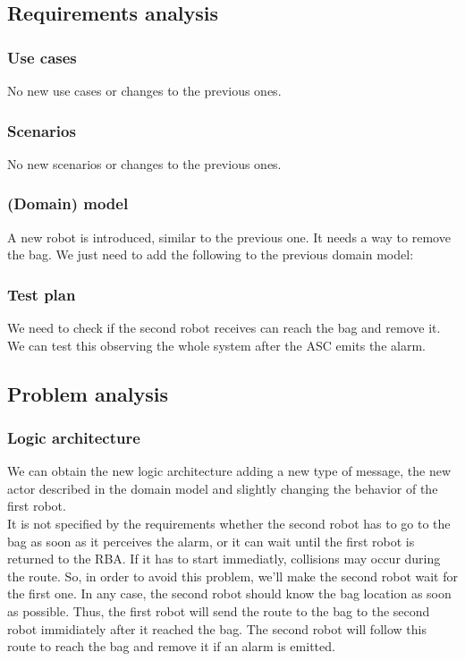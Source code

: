 \documentclass{llncs}
\begin{document}
\subsection{Requirements analysis}
\subsubsection{Use cases}
No new use cases or changes to the previous ones.
\subsubsection{Scenarios}
No new scenarios or changes to the previous ones.
\subsubsection{(Domain) model}
A new robot is introduced, similar to the previous one. It needs a way to remove the bag. We just need to add the following to the previous domain model:

\subsubsection{Test plan}
We need to check if the second robot receives can reach the bag and remove it. We can test this observing the whole system after the ASC emits the alarm.
\subsection{Problem analysis}
\subsubsection{Logic architecture}
We can obtain the new logic architecture adding a new type of message, the new actor described in the domain model and slightly changing the behavior of the first robot.\\
It is not specified by the requirements whether the second robot has to go to the bag as soon as it perceives the alarm, or it can wait until the first robot is returned to the RBA. If it has to start immediatly, collisions may occur during the route. So, in order to avoid this problem, we'll make the second robot wait for the first one. In any case, the second robot should know the bag location as soon as possible. Thus, the first robot will send the route to the bag to the second robot immidiately after it reached the bag. The second robot will follow this route to reach the bag and remove it if an alarm is emitted.

\end{document}
